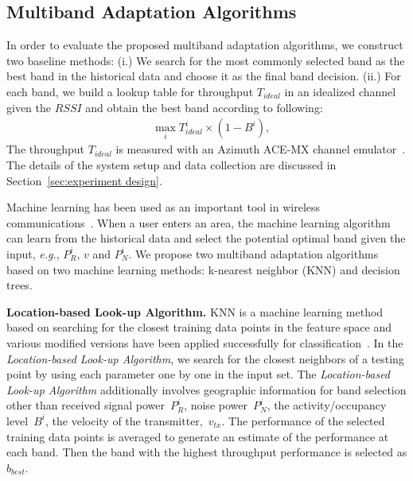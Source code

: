 \subsection{Multiband Adaptation Algorithms}
\label{subsec:algorithms}
In order to evaluate the proposed multiband adaptation algorithms, 
we construct two baseline methods: (i.) We search for the
most commonly selected band as the best band in the historical data
and choose it as the final band decision. (ii.) For each band, we build 
a lookup table for throughput $T_{ideal}$ in an idealized channel given the $RSSI$ and obtain 
the best band according to following:
\begin{align}
&\max_i T_{ideal}^i\times(1-B^i),
\label{eq:baseline2}
\end{align}
The throughput $T_{ideal}$ is measured with an Azimuth ACE-MX channel emulator~\cite{AzimuthACE}. 
The details of the system setup and data collection are discussed in Section~\ref{sec:experiment design}. 

Machine learning has been used as an important tool in wireless communications~\cite{haykin2005cognitive}. When a user enters an area, the machine
learning algorithm can learn from the historical data and
select the potential optimal band given the input, {\it e.g.}, $P_R^i$, $v$
and $P_N^i$. We propose two multiband adaptation algorithms based on
two machine learning methods: k-nearest neighbor (KNN) and decision trees.


{\bf Location-based Look-up Algorithm.} KNN is a machine learning method
based on searching for the closest training data points in the feature space and various
modified versions have been applied successfully for classification~\cite{zhang2006svm}.
In the {\it Location-based Look-up Algorithm}, we search for the closest neighbors of 
a testing point by using each parameter one by one in the input set. 
The {\it Location-based Look-up Algorithm} additionally involves geographic information for band selection other than received signal power~$P_R^i$, noise power~$P_N^i$, the activity/occupancy level~$B^i$, the velocity of the transmitter,~$v_{tx}$.
The 
performance of the selected training data points is averaged to generate an estimate of the performance at each band. Then
the band with the highest throughput performance is selected as $b_{best}$.

